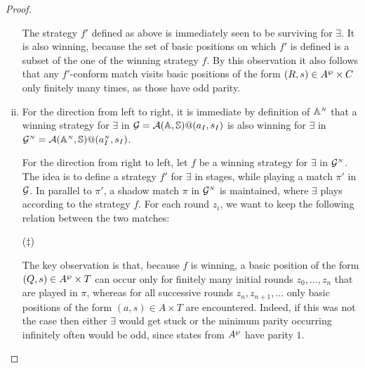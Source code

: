 \begin{proof}
\begin{enumerate}[(i)]
\begin{enumerate}[label=(\alph*),ref=\alph*]
      \end{enumerate}
      The strategy $f'$ defined as above is immediately seen to be
      surviving for $\exists$. It is also winning, because the set of
      basic positions on which $f'$ is defined is a subset of the one
      of the winning strategy $f$. By this observation it also follows that any $f'$-conform match visits basic positions of the form $(R,s) \in A^{\wp} \times C$ only finitely many times, as those have odd parity.
  \item For the direction from left to right, it is immediate by definition of $\mathbb{A}^{{\scriptscriptstyle N}}$ that a winning strategy for $\exists$ in $\mathcal{G} = \mathcal{A}(\mathbb{A},\mathbb{S})@(a_I,s_I)$ is also winning for $\exists$ in $\mathcal{G}^{{\scriptscriptstyle N}} = \mathcal{A}(\mathbb{A}^{{\scriptscriptstyle N}},\mathbb{S})@(a_I^{{\scriptscriptstyle N}},s_I)$.

      For the direction from right to left, let $f$ be a winning strategy for $\exists$ in $\mathcal{G}^{{\scriptscriptstyle N}}$. The idea is to define a strategy $f'$ for $\exists$ in stages, while playing a match $\pi'$ in $\mathcal{G}$. In parallel to $\pi'$, a shadow match $\pi$ in $\mathcal{G}^{{\scriptscriptstyle N}}$ is maintained, where $\exists$ plays according to the strategy $f$. For each round $z_i$, we want to keep the following relation between the two matches:
\smallskip
\begin{center}
\hspace*{0.3cm}($\ddag$)
\end{center}
\smallskip
The key observation is that, because $f$ is winning, a basic position of the form $(Q,s) \in A^{\wp} \times T$ can occur only for finitely many initial rounds $z_0,\dots,z_n$ that are played in $\pi$, whereas for all successive rounds $z_n,z_{n+1},\dots$ only basic positions of the form $(a,s) \in A \times T$ are encountered. Indeed, if this was not the case then either $\exists$ would get stuck or the minimum parity occurring infinitely often would be odd, since states from $A^{\wp}$ have parity $1$.


\end{enumerate}
\end{proof}
